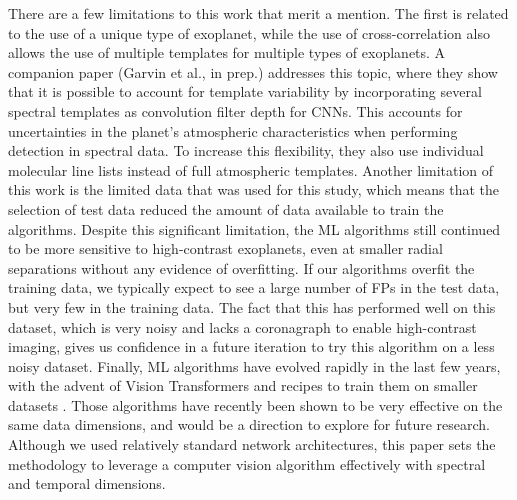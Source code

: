 \documentclass{aa}
\begin{document}
There are a few limitations to this work that merit a mention.
The first  is related to the use of a unique type of exoplanet, while the use of cross-correlation also allows the use of multiple templates for multiple types of exoplanets.
A companion paper (Garvin et al., in prep.) addresses this topic, where they show that it is possible to account for template variability by incorporating several spectral templates as convolution filter depth for CNNs. 
This   accounts for uncertainties in the planet's atmospheric characteristics when performing detection in spectral data.
To increase this flexibility, they also use individual molecular line lists instead of full atmospheric templates.
Another limitation of this work is the limited data that was used for this study, which means that the selection of test data reduced the amount of data available to train the algorithms.
Despite this significant limitation, the ML algorithms still continued to be more sensitive to high-contrast exoplanets, even at smaller radial separations without any evidence of overfitting.
If our algorithms overfit the training data, we typically expect to see a large number of FPs in the test data, but very few in the training data. 
The fact that this has performed well on this dataset, which is very noisy and lacks a coronagraph to enable high-contrast imaging, gives us confidence in a future iteration to try this algorithm on a less noisy dataset.
Finally, ML algorithms have evolved rapidly in the last few years, with the advent of Vision Transformers \citep{2020ViT} and recipes to train them on smaller datasets \citep[e.g.][]{2022Gani}. Those algorithms have recently been shown to be very effective on the same data dimensions, and would be a direction to explore for future research. Although we used relatively standard network architectures, this paper sets the methodology to leverage a computer vision algorithm effectively with spectral and temporal dimensions.
\end{document}
